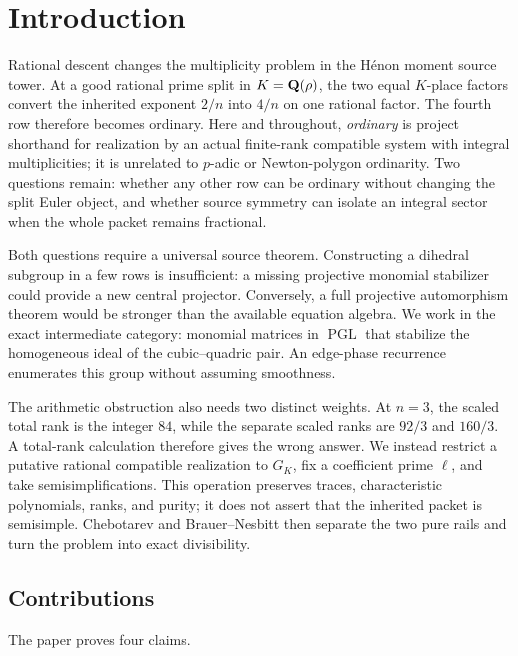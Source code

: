 \section{Introduction}
\label{sec:introduction}

Rational descent changes the multiplicity problem in the H\'enon moment
source tower.  At a good rational prime split in
\(K=\mathbf Q(\rho)\), the two equal \(K\)-place factors convert the inherited
exponent \(2/n\) into \(4/n\) on one rational factor.  The fourth row
therefore becomes ordinary.  Here and throughout, \emph{ordinary} is project
shorthand for realization by an actual finite-rank compatible system with
integral multiplicities; it is unrelated to \(p\)-adic or Newton-polygon
ordinarity.  Two questions remain: whether any other row can be ordinary
without changing the split Euler object, and whether source
symmetry can isolate an integral sector when the whole packet remains
fractional.

Both questions require a universal source theorem.  Constructing a dihedral
subgroup in a few rows is insufficient: a missing projective monomial
stabilizer could provide a new central projector.  Conversely, a full
projective automorphism theorem would be stronger than the available
equation algebra.  We work in the exact intermediate category: monomial
matrices in \(\operatorname{PGL}\) that stabilize the homogeneous ideal of
the cubic--quadric pair.  An edge-phase recurrence enumerates this group
without assuming smoothness.

The arithmetic obstruction also needs two distinct weights.  At \(n=3\),
the scaled total rank is the integer \(84\), while the separate scaled ranks
are \(92/3\) and \(160/3\).  A total-rank calculation therefore gives the
wrong answer.  We instead restrict a putative rational compatible
realization to \(G_K\), fix a coefficient prime \(\ell\), and take
semisimplifications.  This operation preserves traces, characteristic
polynomials, ranks, and purity; it does not assert that the inherited packet
is semisimple.  Chebotarev and Brauer--Nesbitt then separate the two pure
rails and turn the problem into exact divisibility.

\subsection*{Contributions}

The paper proves four claims.

